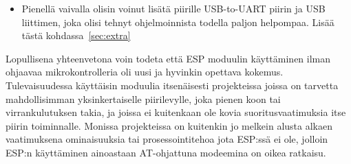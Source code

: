 \begin{itemize}
  \item Pienellä vaivalla olisin voinut lisätä piirille USB-to-UART piirin ja
    USB liittimen, joka olisi tehnyt ohjelmoinnista todella paljon helpompaa.
    Lisää tästä kohdassa~\ref{sec:extra}
\end{itemize}

Lopullisena yhteenvetona voin todeta että ESP moduulin käyttäminen ilman
ohjaavaa mikrokontrolleria oli uusi ja hyvinkin opettava kokemus.
Tulevaisuudessa käyttäisin moduulia itsenäisesti projekteissa joissa on
tarvetta mahdollisimman yksinkertaiselle piirilevylle, joka pienen koon tai
virrankulutuksen takia, ja joissa ei kuitenkaan ole kovia suoritusvaatimuksia
itse piirin toiminnalle. Monissa projekteissa on kuitenkin jo melkein alusta
alkaen vaatimuksena ominaisuuksia tai prosessointitehoa jota ESP:ssä ei ole,
jolloin ESP:n käyttäminen ainoastaan AT-ohjattuna modeemina on oikea ratkaisu.








